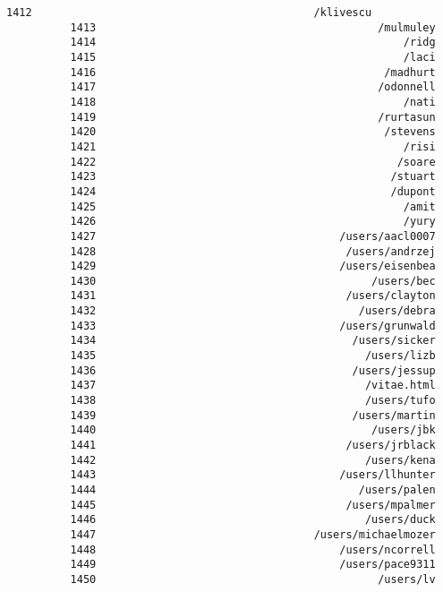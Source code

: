 \documentclass[11pt]{article}
\begin{document}
\begin{Verbatim}[commandchars=\\\{\}]
          1412                                            /klivescu
          1413                                            /mulmuley
          1414                                                /ridg
          1415                                                /laci
          1416                                             /madhurt
          1417                                            /odonnell
          1418                                                /nati
          1419                                            /rurtasun
          1420                                             /stevens
          1421                                                /risi
          1422                                               /soare
          1423                                              /stuart
          1424                                              /dupont
          1425                                                /amit
          1426                                                /yury
          1427                                      /users/aacl0007
          1428                                       /users/andrzej
          1429                                      /users/eisenbea
          1430                                           /users/bec
          1431                                       /users/clayton
          1432                                         /users/debra
          1433                                      /users/grunwald
          1434                                        /users/sicker
          1435                                          /users/lizb
          1436                                        /users/jessup
          1437                                          /vitae.html
          1438                                          /users/tufo
          1439                                        /users/martin
          1440                                           /users/jbk
          1441                                       /users/jrblack
          1442                                          /users/kena
          1443                                      /users/llhunter
          1444                                         /users/palen
          1445                                       /users/mpalmer
          1446                                          /users/duck
          1447                                  /users/michaelmozer
          1448                                      /users/ncorrell
          1449                                      /users/pace9311
          1450                                            /users/lv

\end{Verbatim}
\end{document}
